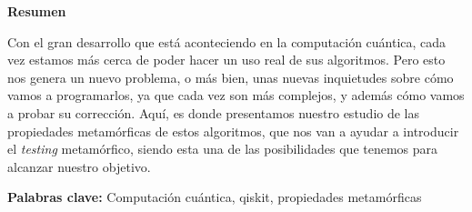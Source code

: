 \newpage

\thispagestyle{empty}

\begin{center}

{\bf \Huge Resumen}

  \end{center}
\vspace{1cm}

 Con el gran desarrollo que está aconteciendo en la computación cuántica, cada vez estamos más cerca de poder hacer un uso real de sus algoritmos. Pero esto nos genera un nuevo problema, o más bien, unas nuevas inquietudes sobre cómo vamos a programarlos, ya que cada vez son más complejos, y además cómo vamos a probar su corrección. Aquí, es donde presentamos nuestro estudio de las propiedades metamórficas de estos algoritmos, que nos van a ayudar a introducir el \textit{testing} metamórfico, siendo esta una de las posibilidades que tenemos para alcanzar nuestro objetivo.

\vspace{2cm}



\textbf{Palabras clave:} Computación cuántica, qiskit, propiedades metamórficas
   
   
   
